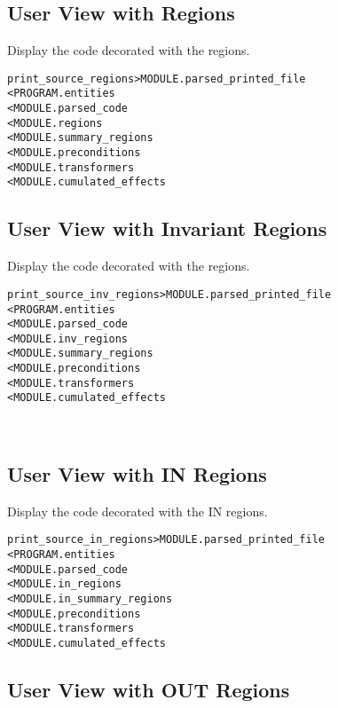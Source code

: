 \documentclass[a4paper]{report}
\newenvironment{PipsMake}{\begin{alltt}}{\end{alltt}}
\begin{document}
\subsection{User View with Regions}

Display the code decorated with the regions.

\begin{PipsMake}
print_source_regions              > MODULE.parsed_printed_file
        < PROGRAM.entities
        < MODULE.parsed_code
        < MODULE.regions
        < MODULE.summary_regions
        < MODULE.preconditions
        < MODULE.transformers
        < MODULE.cumulated_effects
\end{PipsMake}

\subsection{User View with Invariant Regions}

Display the code decorated with the regions.

\begin{PipsMake}
print_source_inv_regions              > MODULE.parsed_printed_file
        < PROGRAM.entities
        < MODULE.parsed_code
        < MODULE.inv_regions
        < MODULE.summary_regions
        < MODULE.preconditions
        < MODULE.transformers
        < MODULE.cumulated_effects
\end{PipsMake}

\
\subsection{User View with IN Regions}

Display the code decorated with the IN regions.

\begin{PipsMake}
print_source_in_regions              > MODULE.parsed_printed_file
        < PROGRAM.entities
        < MODULE.parsed_code
        < MODULE.in_regions
        < MODULE.in_summary_regions
        < MODULE.preconditions
        < MODULE.transformers
        < MODULE.cumulated_effects
\end{PipsMake}

\subsection{User View with OUT Regions}
\end{document}
